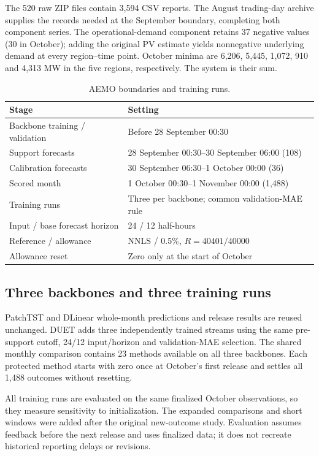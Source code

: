 The 520 raw ZIP files contain 3,594 CSV reports. The August trading-day archive supplies the records needed at the
September boundary, completing both component series. The operational-demand component retains
37 negative values (30 in October); adding the original PV estimate
yields nonnegative underlying demand at every region--time point.
October minima are 6,206, 5,445, 1,072, 910 and 4,313 MW in the five
regions, respectively. The system is their sum.

\begin{table}[htbp]\centering\footnotesize
\caption{AEMO boundaries and training runs.}\label{tab:aemoboundaries}
\setlength{\tabcolsep}{4pt}
\begin{tabular}{ll}\toprule
Stage & Setting\\\midrule
Backbone training / validation & Before 28 September 00:30\\
Support forecasts & 28 September 00:30--30 September 06:00 (108)\\
Calibration forecasts & 30 September 06:30--1 October 00:00 (36)\\
Scored month & 1 October 00:30--1 November 00:00 (1,488)\\
Training runs & Three per backbone; common validation-MAE rule\\
Input / base forecast horizon & 24 / 12 half-hours\\
Reference / allowance & NNLS / 0.5\%, $R=40401/40000$\\
Allowance reset & Zero only at the start of October\\
\bottomrule\end{tabular}
\end{table}
\subsection{Three backbones and three training runs}
PatchTST and DLinear whole-month predictions and release results are reused
unchanged. DUET adds three independently trained streams using the same
pre-support cutoff, 24/12 input/horizon and validation-MAE selection.
The shared monthly comparison contains 23 methods available on all three
backbones. Each protected method starts with zero once at October's first
release and settles all 1,488 outcomes without resetting.

All training runs are evaluated on the same finalized October
observations, so they measure sensitivity to initialization. The expanded
comparisons and short windows were added after the original new-outcome
study. Evaluation assumes feedback before the next release and uses
finalized data; it does not recreate historical reporting delays or
revisions.


